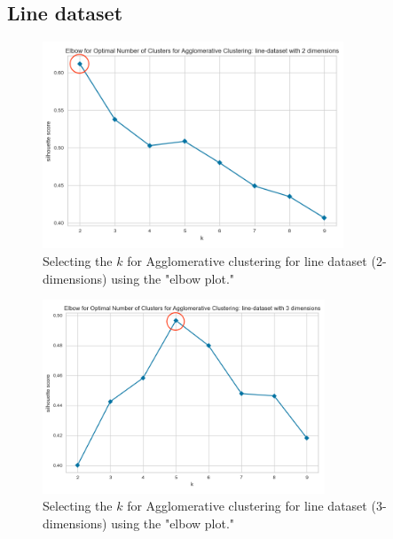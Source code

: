 \subsection{Line dataset}
\begin{figure}[H]
  \includegraphics[width=0.8\textwidth]{line-dataset-2-agglomerative.png}
  \caption{Selecting the $k$ for Agglomerative clustering for line dataset (2-dimensions) using the "elbow plot."}
  \label{hyperparameters:agglomerative-line-dataset-2d}
\end{figure}
\begin{figure}[H]
  \includegraphics[width=0.75\textwidth]{line-dataset-3-agglomerative.png}
  \caption{Selecting the $k$ for Agglomerative clustering for line dataset (3-dimensions) using the "elbow plot."}
  \label{hyperparameters:agglomerative-line-dataset-3d}
\end{figure}
\newpage
